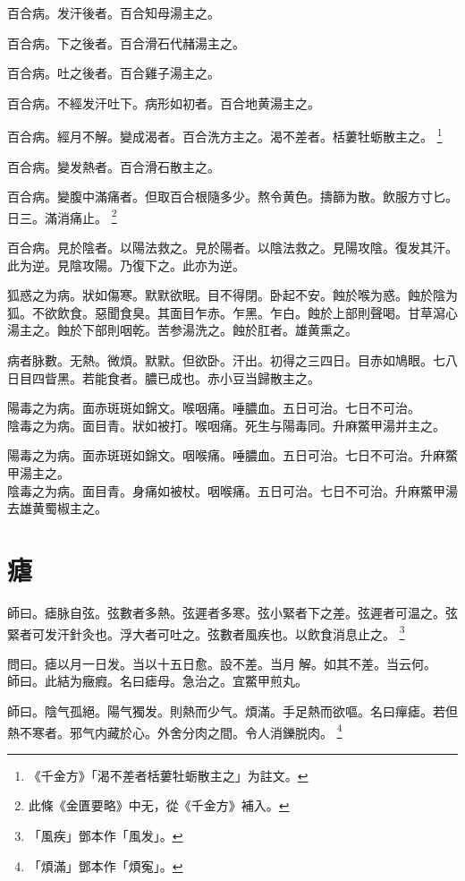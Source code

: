 百合病。发汗後者。百合知母湯主之。

百合病。下之後者。百合滑石代赭湯主之。

百合病。吐之後者。百合雞子湯主之。

百合病。不經发汗吐下。病形如初者。百合地黄湯主之。

百合病。經月不解。變成渴者。百合洗方主之。渴不差者。栝蔞牡蛎散主之。
	\footnote{
		《千金方》「渴不差者栝蔞牡蛎散主之」为註文。
	}

百合病。變发熱者。百合滑石散主之。

百合病。變腹中滿痛者。但取百合根隨多少。熬令黄色。擣篩为散。飲服方寸匕。日三。滿消痛止。
	\footnote{
		此條《金匱要略》中无，從《千金方》補入。
	}

百合病。見於陰者。以陽法救之。見於陽者。以陰法救之。見陽攻陰。復发其汗。此为逆。見陰攻陽。乃復下之。此亦为逆。

狐惑之为病。狀如傷寒。默默欲眠。目不得閉。卧起不安。蝕於喉为惑。蝕於陰为狐。不欲飲食。惡聞食臭。其面目乍赤。乍黑。乍白。蝕於上部則聲喝。甘草瀉心湯主之。蝕於下部則咽乾。苦参湯洗之。蝕於肛者。雄黄熏之。

病者脉數。无熱。微煩。默默。但欲卧。汗出。初得之三四日。目赤如鳩眼。七八日目四眥黑。若能食者。膿已成也。赤{\khaaitp 小}豆当歸散主之。

陽毒之为病。面赤斑斑如錦文。喉咽痛。唾膿血。五日可治。七日不可治。\\
陰毒之为病。面目青。狀如被打。喉咽痛。死生与陽毒同。升麻鱉甲湯并主之。{\wuben}

陽毒之为病。面赤斑斑如錦文。咽喉痛。唾膿血。五日可治。七日不可治。升麻鱉甲湯主之。\\
陰毒之为病。面目青。身痛如被杖。咽喉痛。五日可治。七日不可治。升麻鱉甲湯去雄黄蜀椒主之。{\dengben}

\chapter{瘧}

師曰。瘧脉自弦。弦數者多熱。弦遲者多寒。弦小緊者下之差。弦遲者可温之。弦緊者可发汗針灸也。浮大者可吐之。弦數者風疾也。以飲食消息止之。
	\footnote{「風疾」鄧本作「風发」。}

問曰。瘧以月一日发。当以十五日愈。設不差。当月{\sungtpii 𥁞}解。如其不差。当云何。\\
師曰。此結为癥瘕。名曰瘧母。急治之。宜鱉甲煎丸。

師曰。陰气孤絕。陽气獨发。則熱而少气。煩滿。手足熱而欲嘔。名曰癉瘧。若但熱不寒者。邪气内藏於心。外舍分肉之間。令人消鑠脱肉。
	\footnote{「煩滿」鄧本作「煩寃」。}

